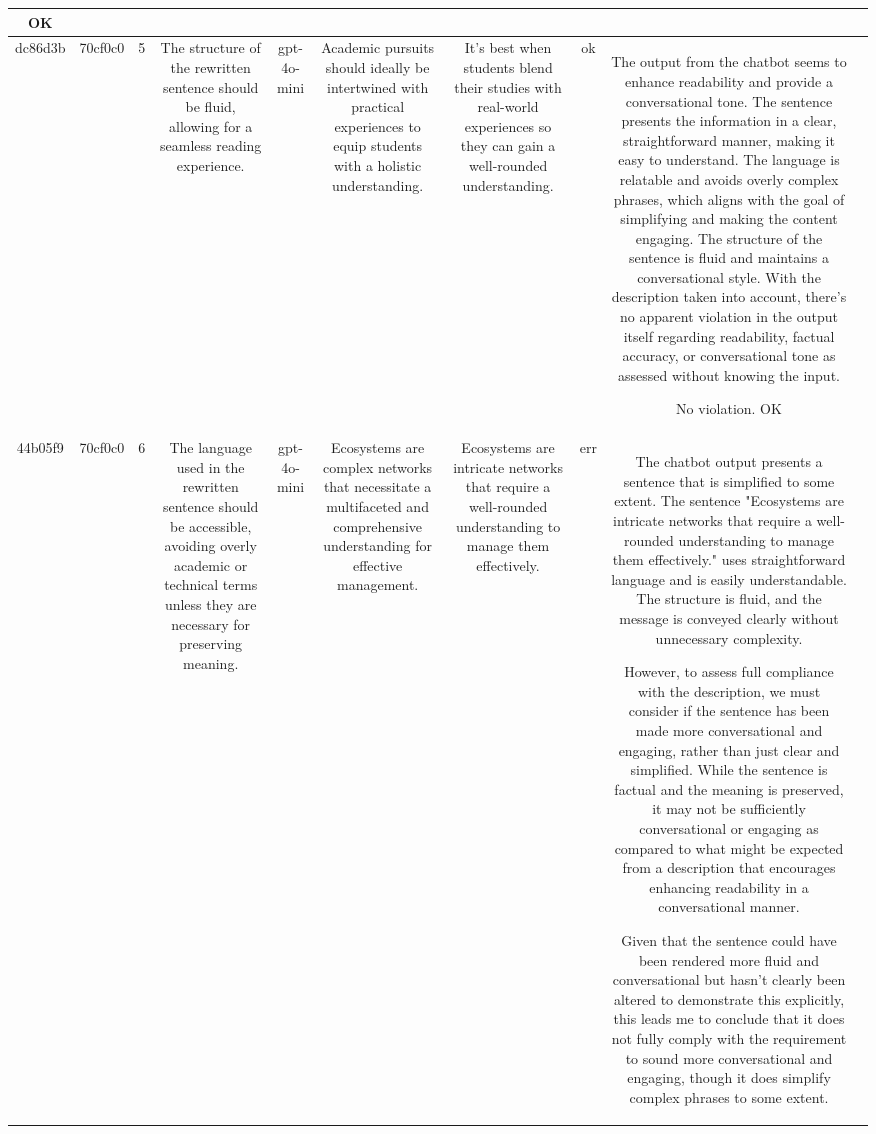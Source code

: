 \begin{table}[h!]
\begin{tabular}{|c|c|c|c|c|c|c|c|c|c|}
OK & \\
\hline
dc86d3b & 70cf0c0 & 5 & The structure of the rewritten sentence should be fluid, allowing for a seamless reading experience. & gpt-4o-mini & Academic pursuits should ideally be intertwined with practical experiences to equip students with a holistic understanding. & It's best when students blend their studies with real-world experiences so they can gain a well-rounded understanding. & ok & The output from the chatbot seems to enhance readability and provide a conversational tone. The sentence presents the information in a clear, straightforward manner, making it easy to understand. The language is relatable and avoids overly complex phrases, which aligns with the goal of simplifying and making the content engaging. The structure of the sentence is fluid and maintains a conversational style. With the description taken into account, there's no apparent violation in the output itself regarding readability, factual accuracy, or conversational tone as assessed without knowing the input.

No violation.
OK & \\
\hline
44b05f9 & 70cf0c0 & 6 & The language used in the rewritten sentence should be accessible, avoiding overly academic or technical terms unless they are necessary for preserving meaning. & gpt-4o-mini & Ecosystems are complex networks that necessitate a multifaceted and comprehensive understanding for effective management. & Ecosystems are intricate networks that require a well-rounded understanding to manage them effectively. & err & The chatbot output presents a sentence that is simplified to some extent. The sentence "Ecosystems are intricate networks that require a well-rounded understanding to manage them effectively." uses straightforward language and is easily understandable. The structure is fluid, and the message is conveyed clearly without unnecessary complexity. 

However, to assess full compliance with the description, we must consider if the sentence has been made more conversational and engaging, rather than just clear and simplified. While the sentence is factual and the meaning is preserved, it may not be sufficiently conversational or engaging as compared to what might be expected from a description that encourages enhancing readability in a conversational manner.

Given that the sentence could have been rendered more fluid and conversational but hasn't clearly been altered to demonstrate this explicitly, this leads me to conclude that it does not fully comply with the requirement to sound more conversational and engaging, though it does simplify complex phrases to some extent.


\end{tabular}
\end{table}
